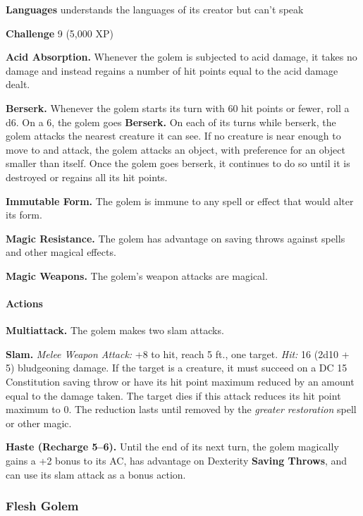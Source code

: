 \documentclass[
]{article}
\begin{document}
\textbf{Languages} understands the languages of its creator but can't
speak

\textbf{Challenge} 9 (5,000 XP)

\textbf{Acid Absorption.} Whenever the golem is subjected to acid
damage, it takes no damage and instead regains a number of hit points
equal to the acid damage dealt.

\textbf{Berserk.} Whenever the golem starts its turn with 60 hit points
or fewer, roll a d6. On a 6, the golem goes \textbf{Berserk.} On each of
its turns while berserk, the golem attacks the nearest creature it can
see. If no creature is near enough to move to and attack, the golem
attacks an object, with preference for an object smaller than itself.
Once the golem goes berserk, it continues to do so until it is destroyed
or regains all its hit points.

\textbf{Immutable Form.} The golem is immune to any spell or effect that
would alter its form.

\textbf{Magic Resistance.} The golem has advantage on saving throws
against spells and other magical effects.

\textbf{Magic Weapons.} The golem's weapon attacks are magical.

\hypertarget{actions-16}{%
\paragraph{Actions}\label{actions-16}}

\textbf{Multiattack.} The golem makes two slam attacks.

\textbf{Slam.} \emph{Melee Weapon Attack:} +8 to hit, reach 5 ft., one
target. \emph{Hit:} 16 (2d10 + 5) bludgeoning damage. If the target is a
creature, it must succeed on a DC 15 Constitution saving throw or have
its hit point maximum reduced by an amount equal to the damage taken.
The target dies if this attack reduces its hit point maximum to 0. The
reduction lasts until removed by the \emph{greater restoration} spell or
other magic.

\textbf{Haste (Recharge 5--6).} Until the end of its next turn, the
golem magically gains a +2 bonus to its AC, has advantage on Dexterity
\textbf{Saving Throws}, and can use its slam attack as a bonus action.

\hypertarget{flesh-golem}{%
\subsubsection{Flesh Golem}\label{flesh-golem}}
\end{document}
